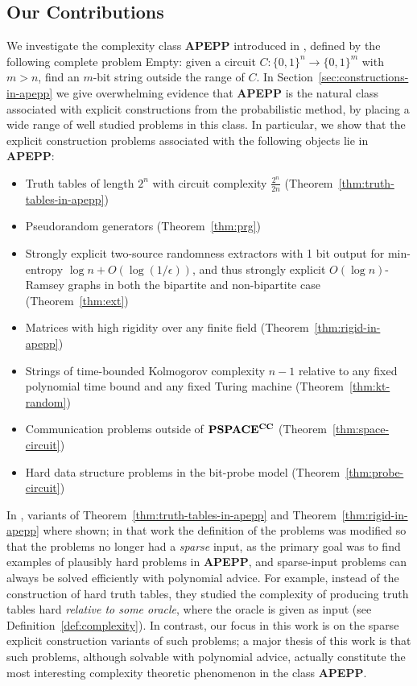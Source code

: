 \documentclass[11pt]{article}
\newcommand{\varbound}{\frac{2^n}{2n}}
\def\cl{\bf}
\begin{document}
\subsection{Our Contributions}
We investigate the complexity class {\cl APEPP} introduced in \cite{total}, defined by the following complete problem {\sc Empty}: given a circuit $C: \{0,1\}^n \rightarrow \{0,1\}^m$ with $m > n$, find an $m$-bit string outside the range of $C$. In Section~\ref{sec:constructions-in-apepp} we give overwhelming evidence that {\cl APEPP} is the natural class associated with explicit constructions from the probabilistic method, by placing a wide range of well studied problems in this class. In particular, we show that the explicit construction problems associated with the following objects lie in {\cl APEPP}:
\begin{itemize}
    \item Truth tables of length $2^n$ with circuit complexity $\varbound$ (Theorem~\ref{thm:truth-tables-in-apepp})
    \item Pseudorandom generators (Theorem~\ref{thm:prg})
    \item Strongly explicit two-source randomness extractors with 1 bit output for min-entropy $\log n + O(\log(1/\epsilon))$, and thus strongly explicit $O(\log n)$-Ramsey graphs in both the bipartite and non-bipartite case (Theorem~\ref{thm:ext})
    \item Matrices with high rigidity over any finite field (Theorem~\ref{thm:rigid-in-apepp})
    \item Strings of time-bounded Kolmogorov complexity $n - 1$ relative to any fixed polynomial time bound and any fixed Turing machine (Theorem~\ref{thm:kt-random})
    \item Communication problems outside of ${\cl PSPACE^{CC}}$ (Theorem~\ref{thm:space-circuit})
    \item Hard data structure problems in the bit-probe model (Theorem~\ref{thm:probe-circuit})
\end{itemize}

In \cite{total}, variants of Theorem~\ref{thm:truth-tables-in-apepp} and Theorem~\ref{thm:rigid-in-apepp} where shown; in that work the definition of the problems was modified so that the problems no longer had a \emph{sparse} input, as the primary goal was to find examples of plausibly hard problems in {\cl APEPP}, and sparse-input problems can always be solved efficiently with polynomial advice. For example, instead of the construction of hard truth tables, they studied the complexity of producing truth tables hard \emph{relative to some oracle}, where the oracle is given as input (see Definition~\ref{def:complexity}). In contrast, our focus in this work is on the sparse explicit construction variants of such problems; a major thesis of this work is that such problems, although solvable with polynomial advice, actually constitute the most interesting complexity theoretic phenomenon in the class {\cl APEPP}.
\end{document}
